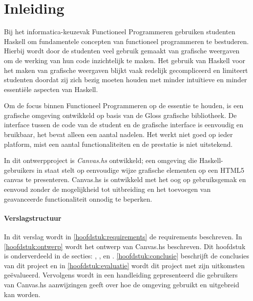 \chapter{Inleiding}
Bij het informatica-keuzevak Functioneel Programmeren gebruiken studenten Haskell om fundamentele concepten van functioneel programmeren te bestuderen. Hierbij wordt door de studenten veel gebruik gemaakt van grafische weergaven om de werking van hun code inzichtelijk te maken. Het gebruik van Haskell voor het maken van grafische weergaven blijkt vaak redelijk gecompliceerd en limiteert studenten doordat zij zich bezig moeten houden met minder intuïtieve en minder essentiële aspecten van Haskell.

Om de focus binnen Functioneel Programmeren op de essentie te houden, is een grafische omgeving ontwikkeld op basis van de Gloss grafische bibliotheek. De interface tussen de code van de student en de grafische interface is eenvoudig en bruikbaar, het bevat alleen een aantal nadelen. Het werkt niet goed op ieder platform, mist een aantal functionaliteiten en de prestatie is niet uitstekend.

In dit ontwerpproject is \emph{Canvas.hs} ontwikkeld; een omgeving die Haskell-gebruikers in staat stelt op eenvoudige wijze grafische elementen op een HTML5 canvas te presenteren. Canvas.hs is ontwikkeld met het oog op gebruiksgemak en eenvoud zonder de mogelijkheid tot uitbreiding en het toevoegen van geavanceerde functionaliteit onnodig te beperken.

\subsubsection{Verslagstructuur}
In dit verslag wordt in \autoref{hoofdstuk:requirements} de requirements beschreven. In  \autoref{hoofdstuk:ontwerp} wordt het ontwerp van Canvas.hs beschreven. Dit hoofdstuk is onderverdeeld in de secties: , ,  en . \autoref{hoofdstuk:conclusie} beschrijft de conclusies van dit project en in \autoref{hoofdstuk:evaluatie} wordt dit project met zijn uitkomsten geëvalueerd. Vervolgens wordt in  een handleiding gepresenteerd die gebruikers van Canvas.hs aanwijzingen geeft over hoe de omgeving gebruikt en uitgebreid kan worden.


